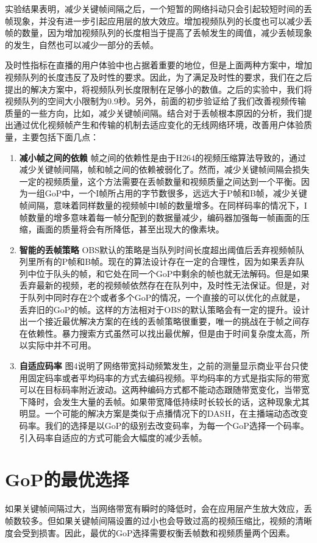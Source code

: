 实验结果表明，减少关键帧间隔之后，一个短暂的网络抖动只会引起较短时间的丢帧现象，并没有进一步引起应用层的放大效应。增加视频队列的长度也可以减少丢帧的数量，因为增加视频队列的长度相当于提高了丢帧发生的阈值，减少丢帧现象的发生，自然也可以减少一部分的丢帧。

及时性指标在直播的用户体验中也占据着重要的地位，但是上面两种方案中，增加视频队列的长度违反了及时性的要求。因此，为了满足及时性的要求，我们在之后提出的解决方案中，将视频队列长度限制在足够小的数值。之后的实验中，我们将视频队列的空间大小限制为0.9秒。另外，前面的初步验证给了我们改善视频传输质量的一些方向，比如，减少关键帧间隔。结合对于丢帧根本原因的分析，我们提出通过优化视频帧产生和传输的机制去适应变化的无线网络环境，改善用户体验质量，主要包括下面几点：

\begin{enumerate}
\item \textbf{减小帧之间的依赖} 帧之间的依赖性是由于H264的视频压缩算法导致的，通过减少关键帧间隔，帧和帧之间的依赖被弱化了。然而，减少关键帧间隔会损失一定的视频质量，这个方法需要在丢帧数量和视频质量之间达到一个平衡。因为一组GoP中，一个I帧所占用的字节数很多，远远大于P帧和B帧，减少关键帧间隔，意味着同样数量的视频帧中I帧的数量增多。在同样码率的情况下，I帧数量的增多意味着每一帧分配到的数据量减少，编码器加强每一帧画面的压缩，画面的质量将会有所降低，甚至出现大的像素块。
\item \textbf{智能的丢帧策略} OBS默认的策略是当队列时间长度超出阈值后丢弃视频帧队列里所有的P帧和B帧。现在的算法设计存在一定的合理性，因为如果丢弃队列中位于队头的帧，和它处在同一个GoP中剩余的帧也就无法解码。但是如果丢弃最新的视频，老的视频帧依然存在在队列中，及时性无法保证。但是，对于队列中同时存在2个或者多个GoP的情况，一个直接的可以优化的点就是，丢弃旧的GoP的帧。这样的方法相对于OBS的默认策略会有一定的提升。设计出一个接近最优解决方案的在线的丢帧策略很重要，唯一的挑战在于帧之间存在依赖性。暴力搜索方式虽然可以找出最优解，但是由于时间复杂度太高，所以实际中并不可用。
\item \textbf{自适应码率} 图4说明了网络带宽抖动频繁发生，之前的测量显示商业平台只使用固定码率或者平均码率的方式去编码视频。平均码率的方式是指实际的带宽可以在目标码率附近波动。这两种编码方式都不能动态跟随带宽变化，当带宽下降时，会发生大量的丢帧。如果带宽降低持续时长较长的话，这种现象尤其明显。一个可能的解决方案是类似于点播情况下的DASH，在主播端动态改变码率。我们的选择是以GoP的级别去改变码率，为每一个GoP选择一个码率。引入码率自适应的方式可能会大幅度的减少丢帧。
\end{enumerate}


\section{GoP的最优选择}
如果关键帧间隔过大，当网络带宽有瞬时的降低时，会在应用层产生放大效应，丢帧数较多。但如果关键帧间隔设置的过小也会导致过高的视频压缩比，视频的清晰度会受到损害。因此，最优的GoP选择需要权衡丢帧数和视频质量两个因素。


